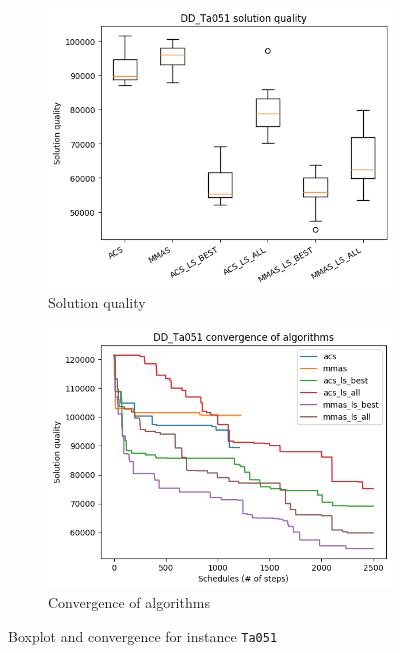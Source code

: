 \documentclass[runningheads]{llncs}
\begin{document}
\begin{figure}[H]
    \begin{subfigure}{.5\textwidth}
        \centering
        \includegraphics[width=1\linewidth]{plots/DD_Ta051__boxplot}
        \caption{Solution quality}
        \label{fig:ta_051:boxplot}
    \end{subfigure}
    \begin{subfigure}{.5\textwidth}
        \centering
        \includegraphics[width=1\linewidth]{plots/DD_Ta051__best_runs_convergence}
        \caption{Convergence of algorithms}
        \label{fig:ta_051:convergence}
    \end{subfigure}
    \caption{Boxplot and convergence for instance \texttt{Ta051}}
    \label{fig:ta_051}
\end{figure}
\end{document}
